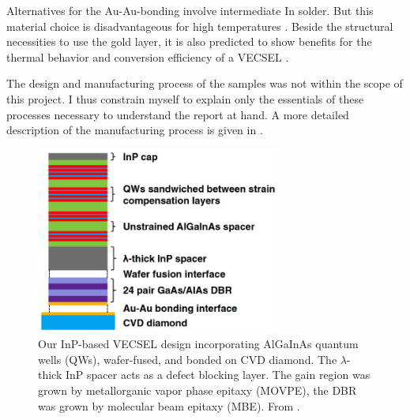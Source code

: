 Alternatives for
the Au-Au-bonding
involve intermediate In solder.
But this material choice
is disadvantageous
for high temperatures
\cite{Ranta2014OptLett}.
Beside the structural necessities
to use the gold layer,
it is also predicted
to show benefits
for the thermal behavior
and conversion efficiency
of a VECSEL
\cite{Hader2011,Devautour2013}.

The design and
manufacturing process
of the samples
was not within the scope
of this project.
I thus constrain myself
to explain only
the essentials
of these processes
necessary
to understand the report
at hand.
A more detailed description
of the manufacturing process
is given in \cite{Ranta2014OptLett,Sirbu2014SPIE}.

\begin{figure}
\centering
\includegraphics[width=8cm]{img/wafer_fusion.png}
\caption{Our InP-based VECSEL design
incorporating AlGaInAs quantum wells (QWs),
wafer-fused,
and bonded on CVD diamond.
The $\lambda$-thick InP spacer
acts as a defect blocking layer.
The gain region was grown
by metallorganic vapor phase epitaxy (MOVPE),
the DBR was grown
by molecular beam epitaxy (MBE).
From \cite{Ranta2014OptLett,Sirbu2014SPIE}.}
\label{img:wafer_fusion}
\end{figure}

